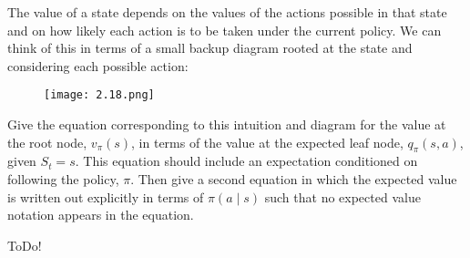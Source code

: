 
\begin{exercise}[Exercise 3.18]

The value of a state depends on the values of the actions possible in that state and on how likely each action is to be taken under the current policy.
We can think of this in terms of a small backup diagram rooted at the state and considering each possible action:

\begin{figure}[H]
    \centering
    \texttt{[image: 2.18.png]}
    \caption{}
    \label{fig:2.18}
\end{figure}

Give the equation corresponding to this intuition and diagram for the value at the root node, $v_\pi(s)$, in terms of the value at the expected leaf node, $q_\pi(s, a)$, given $S_t = s$.
This equation should include an expectation conditioned on following the policy, $\pi$.
Then give a second equation in which the expected value is written out explicitly in terms of $\pi(a \mid s)$ such that no expected value notation appears in the equation.

\end{exercise}


\begin{solution}

ToDo!

\end{solution}

